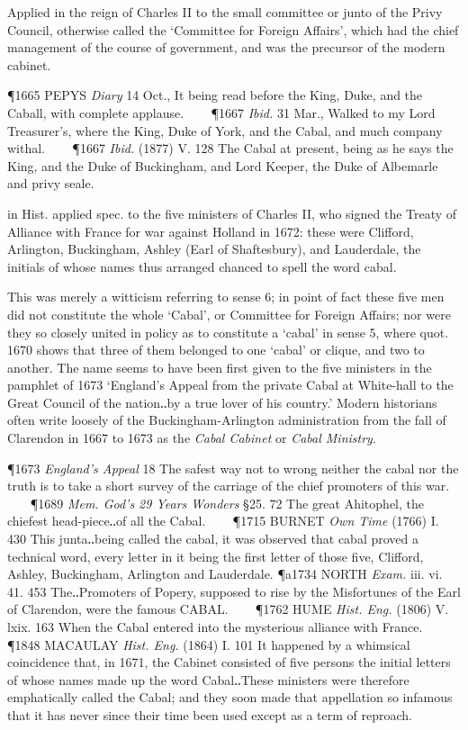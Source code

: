 \begin{description}[wide, labelwidth=!, labelindent=0pt]
\begin{myenumerate}
 Applied in the reign of Charles II to the small committee or junto of the Privy Council, otherwise called the ‘Committee for Foreign Affairs’, which had the chief management of the course of government, and was the precursor of the modern cabinet.

\P 1665 PEPYS  \textit{Diary} 14 Oct., It being read before the King, Duke, and the Caball, with complete applause.    
\P 1667 \textit{Ibid.} 31 Mar., Walked to my Lord Treasurer's, where the King, Duke of York, and the Cabal, and much company withal.    
\P 1667 \textit{Ibid.} (1877) V. 128 The Cabal at present, being as he says the King, and the Duke of Buckingham, and Lord Keeper, the Duke of Albemarle and privy seale.

 in Hist. applied spec. to the five ministers of Charles II, who signed the Treaty of Alliance with France for war against Holland in 1672: these were Clifford, Arlington, Buckingham, Ashley (Earl of Shaftesbury), and Lauderdale, the initials of whose names thus arranged chanced to spell the word cabal.

This was merely a witticism referring to sense 6; in point of fact these five men did not constitute the whole ‘Cabal’, or Committee for Foreign Affairs; nor were they so closely united in policy as to constitute a ‘cabal’ in sense 5, where quot. 
1670 shows that three of them belonged to one ‘cabal’ or clique, and two to another. The name seems to have been first given to the five ministers in the pamphlet of
1673 ‘England's  Appeal from the private Cabal at White-hall to the Great Council of the nation‥by a true lover of his country.’ Modern historians often write loosely of the Buckingham-Arlington administration from the fall of Clarendon in
1667 to 1673 as the  \textit{Cabal Cabinet} or \textit{Cabal Ministry}.

\P 1673 \textit{England's  Appeal} 18 The safest way not to wrong neither the cabal nor the truth is to take a short survey of the carriage of the chief promoters of this war.    
\P 1689 \textit{Mem. God's 29 Years Wonders} §25. 72 The great Ahitophel, the chiefest head-piece‥of all the Cabal.    
\P 1715 BURNET  \textit{Own Time} (1766) I. 430 This junta‥being called the cabal, it was observed that cabal proved a technical word, every letter in it being the first letter of those five, Clifford, Ashley, Buckingham, Arlington and Lauderdale.
\P a1734 NORTH  \textit{Exam.} iii. vi. 41. 453 The‥Promoters of Popery, supposed to rise by the Misfortunes of the Earl of Clarendon, were the famous CABAL.    
\P 1762 HUME  \textit{Hist. Eng.} (1806) V. lxix. 163 When the Cabal entered into the mysterious alliance with France.    
\P 1848 MACAULAY  \textit{Hist. Eng.} (1864) I. 101 It happened by a whimsical coincidence that, in 1671, the Cabinet consisted of five persons the initial letters of whose names made up the word Cabal‥These ministers were therefore emphatically called the Cabal; and they soon made that appellation so infamous that it has never since their time been used except as a term of reproach.


\end{myenumerate}
\end{description}
